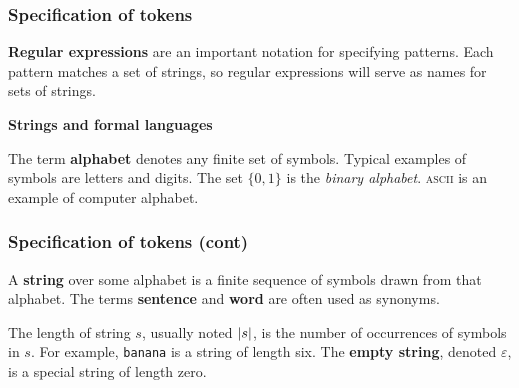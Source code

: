 %
\begin{frame}
\frametitle{Specification of tokens}

\textbf{Regular expressions} are an important notation for specifying
patterns. Each pattern matches a set of strings, so regular
expressions will serve as names for sets of strings.

\bigskip

\textbf{Strings and formal languages}

\bigskip

The term \textbf{alphabet} denotes any finite set of symbols. Typical
examples of symbols are letters and digits. The set \(\{0, 1\}\) is
the \emph{binary alphabet}. \textsc{ascii} is an example of computer
alphabet.

\end{frame}

%
\begin{frame}
\frametitle{Specification of tokens (cont)}

A \textbf{string} over some alphabet is a finite sequence of symbols
drawn from that alphabet. The terms \textbf{sentence}
and \textbf{word} are often used as synonyms.

\bigskip

The length of string \(s\), usually noted \(\lvert s\rvert\), is the
number of occurrences of symbols in \(s\). For
example, \texttt{banana} is a string of length six. The \textbf{empty
string}, denoted \(\varepsilon\), is a special string of length zero.

\end{frame}

